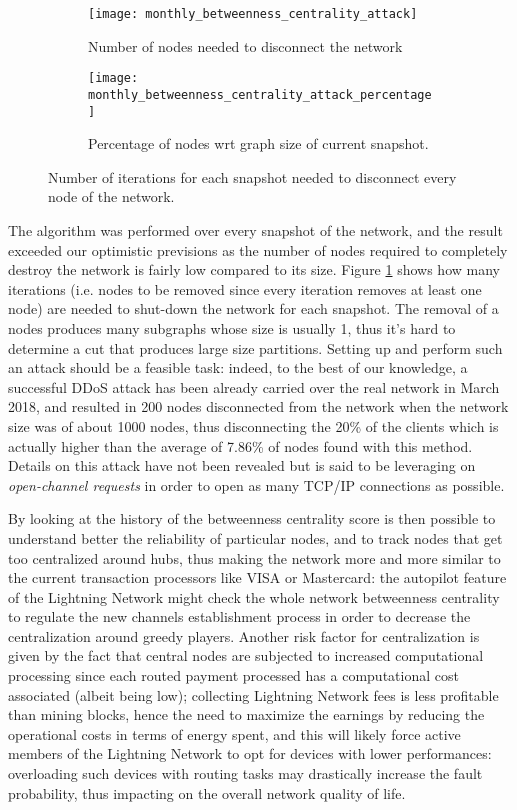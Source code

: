 	\begin{figure}[h]
		\centering
		\begin{subfigure}{0.45\textwidth}
			\centering
			\texttt{[image: monthly\_betweenness\_centrality\_attack]}
			\caption{Number of nodes needed to disconnect the network}
		\end{subfigure}
		\begin{subfigure}{0.45\textwidth}
			\centering
			\texttt{[image: monthly\_betweenness\_centrality\_attack\_percentage]}
			\caption{Percentage of nodes wrt graph size of current snapshot.}
		\end{subfigure}
		\caption{Number of iterations for each snapshot needed to disconnect every node of the network.}
		\label{betweenness_attack}
	\end{figure}
	
	The algorithm was performed over every snapshot of the network, and the result exceeded our optimistic previsions as the number of nodes required to completely destroy the network is fairly low compared to its size. Figure \ref{betweenness_attack} shows	how many iterations (i.e. nodes to be removed since every iteration removes at least one node) are needed to shut-down the network for each snapshot. The removal of a nodes produces many subgraphs whose size is usually 1, thus it's hard to determine a cut that produces large size partitions. Setting up and perform such an attack should be a feasible task: indeed, to the best of our knowledge, a successful DDoS attack has been already carried over the real network in March 2018, and resulted in 200 nodes disconnected from the network when the network size was of about 1000 nodes, thus disconnecting the 20\% of the clients which is actually higher than the average of 7.86\% of nodes found with this method. Details on this attack have not been revealed but is said to be leveraging on \textit{open-channel requests} in order to open as many TCP/IP connections as possible.
	
	By looking at the history of the betweenness centrality score is then possible to understand better the reliability of particular nodes, and to track nodes that get too centralized around hubs, thus making the network more and more similar to the current transaction processors like VISA or Mastercard: the autopilot feature of the Lightning Network might check the whole network betweenness centrality to regulate the new channels establishment process in order to decrease the centralization around greedy players. Another risk factor for centralization is given by the fact that central nodes are subjected to increased computational processing since each routed payment processed has a computational cost associated (albeit being low); collecting Lightning Network fees is less profitable than mining blocks, hence the need to maximize the earnings by reducing the operational costs in terms of energy spent, and this will likely force active members of the Lightning Network to opt for devices with lower performances: overloading such devices with routing tasks may drastically increase the fault probability, thus impacting on the overall network quality of life.
	
